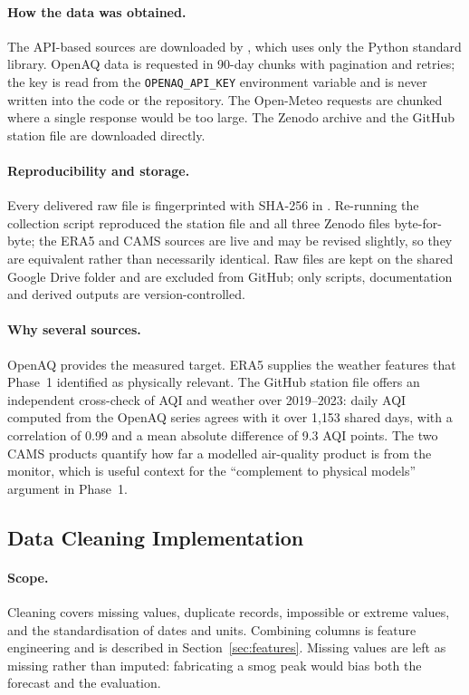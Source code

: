 \paragraph{How the data was obtained.}
The API-based sources are downloaded by , which uses only the Python standard library. OpenAQ data is requested in 90-day chunks with pagination and retries; the key is read from the \texttt{OPENAQ\_API\_KEY} environment variable and is never written into the code or the repository. The Open-Meteo requests are chunked where a single response would be too large. The Zenodo archive and the GitHub station file are downloaded directly.

\paragraph{Reproducibility and storage.}
Every delivered raw file is fingerprinted with SHA-256 in . Re-running the collection script reproduced the station file and all three Zenodo files byte-for-byte; the ERA5 and CAMS sources are live and may be revised slightly, so they are equivalent rather than necessarily identical. Raw files are kept on the shared Google Drive folder and are excluded from GitHub; only scripts, documentation and derived outputs are version-controlled.

\paragraph{Why several sources.}
OpenAQ provides the measured target. ERA5 supplies the weather features that Phase~1 identified as physically relevant. The GitHub station file offers an independent cross-check of AQI and weather over 2019--2023: daily AQI computed from the OpenAQ series agrees with it over 1{,}153 shared days, with a correlation of 0.99 and a mean absolute difference of 9.3 AQI points. The two CAMS products quantify how far a modelled air-quality product is from the monitor, which is useful context for the ``complement to physical models'' argument in Phase~1.

\subsection{Data Cleaning Implementation}

\paragraph{Scope.}
Cleaning covers missing values, duplicate records, impossible or extreme values, and the standardisation of dates and units. Combining columns is feature engineering and is described in Section~\ref{sec:features}. Missing values are left as missing rather than imputed: fabricating a smog peak would bias both the forecast and the evaluation.

